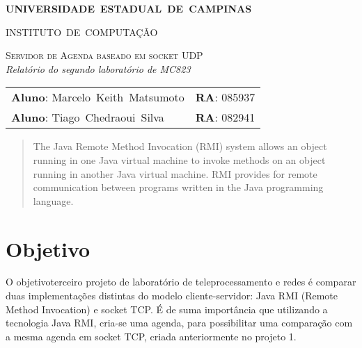 \documentclass[10pt,a4paper]{article}
\begin{document}
\begin{titlepage}
  \thispagestyle{empty}
  \begin{center} {\large \textbf{UNIVERSIDADE~ESTADUAL~DE~CAMPINAS}} \end{center}
  \begin{center} {\large INSTITUTO~DE~COMPUTAÇÃO}                    \end{center}
  \vspace{0.1cm}
  \begin{center}
    \begin{minipage}[tl]{31mm}
    \end{minipage}
  \end{center}
  \vspace{0.3cm}
  \begin{center} 
    {\large \textsc{Servidor de Agenda baseado em socket UDP
      }} 
    \\\vspace{0.5cm}
    {\textsl{Relatório do segundo laboratório de MC823}}
    \\\vspace{1cm}
    \begin{tabular}{ll}
      \textbf{Aluno}:        Marcelo~Keith~Matsumoto   &  \textbf{RA}:       085937 \\
      \textbf{Aluno}:        Tiago~Chedraoui~Silva    &   \textbf{RA}:       082941 \\
      
    \end{tabular}
  \end{center}
  \vspace{0.5cm}

  \begin{abstract}

    The Java Remote Method Invocation (RMI) system allows an object running in one Java virtual machine to invoke methods on an object running in another Java virtual machine. RMI provides for remote communication between programs written in the Java programming language.

  \end{abstract}

\end{titlepage} 
\tableofcontents

\newpage


\section{Objetivo}
O objetivoterceiro projeto de laboratório de teleprocessamento e redes é
comparar duas implementações distintas do modelo cliente-servidor: Java
RMI (Remote Method Invocation) e socket TCP. 
É de suma importância que utilizando a tecnologia Java RMI, cria-se
uma agenda, para possibilitar uma comparação
com a mesma agenda em socket TCP, criada anteriormente no projeto 1.
\end{document}
